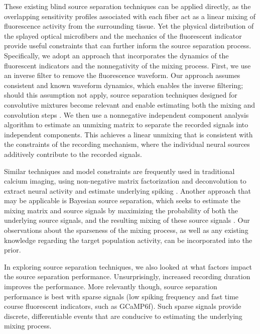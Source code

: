 These existing blind source separation techniques can be applied directly, as the overlapping sensitivity profiles associated with each fiber act as a linear mixing of fluorescence activity from the surrounding tissue. Yet the physical distribution of the splayed optical microfibers and the mechanics of the fluorescent indicator provide useful constraints that can further inform the source separation process. Specifically, we adopt an approach that incorporates the dynamics of the fluorescent indicators and the nonnegativity of the mixing process. First, we use an inverse filter to remove the fluorescence waveform. Our approach assumes consistent and known waveform dynamics, which enables the inverse filtering; should this assumption not apply, source separation techniques designed for convolutive mixtures become relevant and enable estimating both the mixing and convolution steps \cite{Mitianoudis:2003dw,Ozerov:2010jf}.  We then use a nonnegative independent component analysis algorithm to estimate an unmixing matrix to separate the recorded signals into independent components. This achieves a linear unmixing that is consistent with the constraints of the recording mechanism, where the individual neural sources additively contribute to the recorded signals. 


Similar techniques and model constraints are frequently used in traditional calcium imaging, using non-negative matrix factorization and deconvolution to extract neural activity and estimate underlying spiking \cite{Pnevmatikakis:2016gr}. Another approach that may be applicable is Bayesian source separation, which seeks to estimate the mixing matrix and source signals by maximizing the probability of both the underlying source signals, and the resulting mixing of these source signals \cite{Knuth:2002vo}. Our observations about the sparseness of the mixing process, as well as any existing knowledge regarding the target population activity, can be incorporated into the prior.

In exploring source separation techniques, we also looked at what factors impact the source separation performance. Unsurprisingly, increased recording duration improves the performance. More relevantly though, source separation performance is best with sparse signals (low spiking frequency and fast time course fluorescent indicators, such as GCaMP6f). Such sparse signals provide discrete, differentiable events that are conducive to estimating the underlying mixing process.

